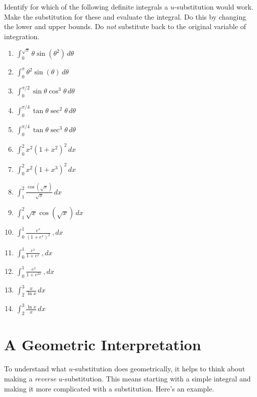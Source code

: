 \documentclass{ximera}
\begin{document}
\begin{question}\label{Q7yyweff}
Identify for which of the following definite integrals a $u$-substitution would work. Make the substitution for these and evaluate the integral. Do this by changing the lower and upper bounds. Do \emph{not} substitute back to the original variable of integration.

\begin{enumerate}

\item $\int_0^{\sqrt{\pi}} \theta \sin(\theta^2)\, d\theta$

\item $\int_0^{\pi} \theta^2 \sin(\theta)\, d\theta$

\item $\int_0^{\pi/2} \sin\theta \cos^3\theta \, d\theta$

\item $\int_0^{\pi/4} \tan\theta \sec^2\theta \, d\theta$

\item $\int_0^{\pi/4} \tan\theta \sec^3\theta \, d\theta$

\item $\int_0^2 x^2 (1+x^2)^2 \, dx$

\item $\int_0^2 x^2 (1+x^3)^2 \, dx$

\item $\int_1^2 \frac{\cos \left( \sqrt{x} \right)}{\sqrt{x}}\, dx$

\item $\int_1^2 \sqrt{x} \cos \left( \sqrt{x} \right)\, dx$

\item $\int_0^1 \frac{e^x}{(1+e^x)^2} \ , dx$

\item $\int_0^1 \frac{e^x}{1+e^x} \ , dx$

\item $\int_0^1 \frac{e^x}{1+e^{2x}} \ , dx$

\item $\int_2^3  \frac{x}{\ln x}\, dx$

\item $\int_2^3  \frac{\ln x}{x}\, dx$


\end{enumerate}

\end{question}


\section{A Geometric Interpretation}
To understand what $u$-substitution does geometrically, it helps to think about making a \emph{reverse} $u$-substitution. This means starting with a simple integral and making it more complicated with a substitution. Here's an example.
\end{document}

